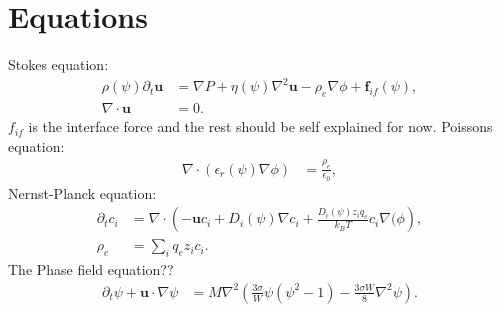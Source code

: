 \documentclass[a4paper,10pt]{article}
\numberwithin{equation}{section}
\numberwithin{figure}{section}
\begin{document}
\section{Equations}
Stokes equation:
\begin{align}
\rho(\psi) \partial_t \mathbf{u}  &=  \nabla P +\eta(\psi) \nabla^2 \mathbf{u} -  \rho_e  \nabla \phi + \mathbf{f}_{if}(\psi),  \\  
\nabla \cdot\mathbf{u} &= 0.
\end{align}
$f_{if}$ is the interface force and the rest should be self explained for now. \newline
Poissons equation: 
\begin{align}
\nabla\cdot\left(\epsilon_r(\psi)\nabla\phi\right) &= \frac{\rho_e}{\epsilon_0 },
\end{align}
Nernst-Planck equation:
\begin{align}
\partial_t c_i  &=  \nabla  \cdot  \left( - \mathbf{u} c_i  + D_i(\psi) \nabla c_i  +   \frac{D_i(\psi) z_i q_e}{k_B T} c_i \nabla( \phi \right), \\
\rho_e &= \sum_i q_e z_i c_i. 
\end{align}
The Phase field equation?? 
\begin{align}
\partial_t \psi + \mathbf{u}\cdot\nabla\psi &= M\nabla^2\left(\frac{3 \sigma }{W} \psi \left(\psi^2 -1\right) - \frac{3 \sigma W}{8}\nabla^2 \psi\right).
\end{align}
\end{document}
